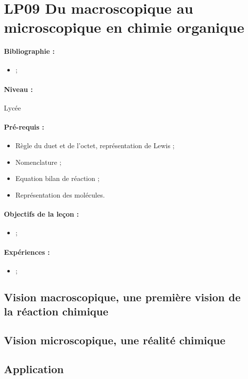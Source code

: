 \section{LP09 Du macroscopique au microscopique en chimie organique}

\paragraph{Bibliographie :}
\begin{itemize}
\item ;
\end{itemize}

\paragraph{Niveau :} Lycée

\paragraph{Pré-requis :}
\begin{itemize}
\item Règle du duet et de l'octet, représentation de Lewis ;
\item Nomenclature ;
\item Equation bilan de réaction ;
\item Représentation des molécules.
\end{itemize}

\paragraph{Objectifs de la leçon :}
\begin{itemize}
\item ;
\end{itemize}

\paragraph{Expériences :}
\begin{itemize}
\item ;
\end{itemize}

\subsection{Vision macroscopique, une première vision de la réaction chimique}

\subsection{Vision microscopique, une réalité chimique}

\subsection{Application}